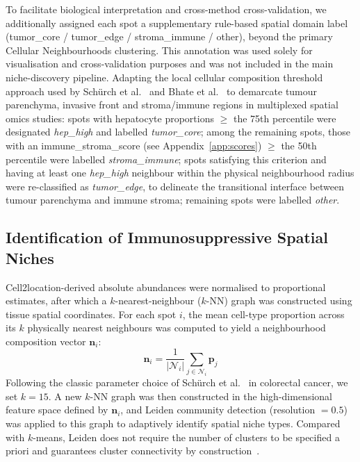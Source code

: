 \documentclass[12pt, a4paper]{article}
\begin{document}
To facilitate biological interpretation and cross-method cross-validation, we additionally assigned each spot a supplementary rule-based spatial domain label (tumor\_core / tumor\_edge / stroma\_immune / other), beyond the primary Cellular Neighbourhoods clustering. This annotation was used solely for visualisation and cross-validation purposes and was not included in the main niche-discovery pipeline. Adapting the local cellular composition threshold approach used by Schürch et al.~\citep{schurch2020coordinated} and Bhate et al.~\citep{bhate2022tissue} to demarcate tumour parenchyma, invasive front and stroma/immune regions in multiplexed spatial omics studies: spots with hepatocyte proportions $\geq$ the 75th percentile were designated \textit{hep\_high} and labelled \textit{tumor\_core}; among the remaining spots, those with an immune\_stroma\_score (see Appendix~\ref{app:scores}) $\geq$ the 50th percentile were labelled \textit{stroma\_immune}; spots satisfying this criterion and having at least one \textit{hep\_high} neighbour within the physical neighbourhood radius were re-classified as \textit{tumor\_edge}, to delineate the transitional interface between tumour parenchyma and immune stroma; remaining spots were labelled \textit{other}.

\subsection{Identification of Immunosuppressive Spatial Niches}

Cell2location-derived absolute abundances were normalised to proportional estimates, after which a $k$-nearest-neighbour ($k$-NN) graph was constructed using tissue spatial coordinates. For each spot $i$, the mean cell-type proportion across its $k$ physically nearest neighbours was computed to yield a neighbourhood composition vector $\mathbf{n}_i$:
\begin{equation}
\mathbf{n}_i = \frac{1}{|\mathcal{N}_i|} \sum_{j \in \mathcal{N}_i} \mathbf{p}_j
\label{eq:neighborhood_vector}
\end{equation}
Following the classic parameter choice of Schürch et al.~\citep{schurch2020coordinated} in colorectal cancer, we set $k = 15$. A new $k$-NN graph was then constructed in the high-dimensional feature space defined by $\mathbf{n}_i$, and Leiden community detection (resolution $= 0.5$) was applied to this graph to adaptively identify spatial niche types. Compared with $k$-means, Leiden does not require the number of clusters to be specified a priori and guarantees cluster connectivity by construction~\citep{traag2019leiden}.
\end{document}
